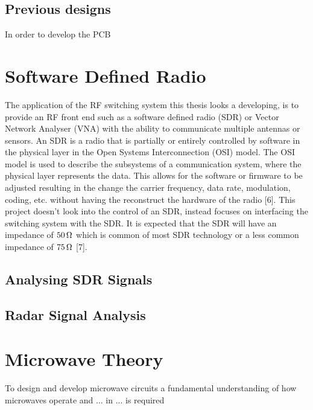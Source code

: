 \documentclass[12pt,openany,a4paper]{book}
\newcommand{\ohm}	{\ensuremath{\rm\,\Omega}}
\begin{document}
\subsection{Previous designs}
In order to develop the PCB 




\section{Software Defined Radio}
The application of the RF switching system this thesis looks a developing, is to provide an RF front end such as a software defined radio (SDR) or Vector Network Analyser (VNA) with the ability to communicate multiple antennas or sensors. An SDR is a radio that is partially or entirely controlled by software in the physical layer in the Open Systems Interconnection (OSI) model. The OSI model is used to describe the subsystems of a communication system, where the physical layer represents the data. This allows for the software or firmware to be adjusted resulting in the change the carrier frequency, data rate, modulation, coding, etc. without having the reconstruct the hardware of the radio [6]. This project doesn't look into the control of an SDR, instead focuses on interfacing the switching system with the SDR. It is expected that the SDR will have an impedance of $50\ohm$ which is common of most SDR technology or a less common impedance of $75\ohm$ [7].

\subsection{Analysing SDR Signals}

\subsection{Radar Signal Analysis}



\section{Microwave Theory}
To design and develop microwave circuits a fundamental understanding of how microwaves operate and ... in ... is required
\end{document}
